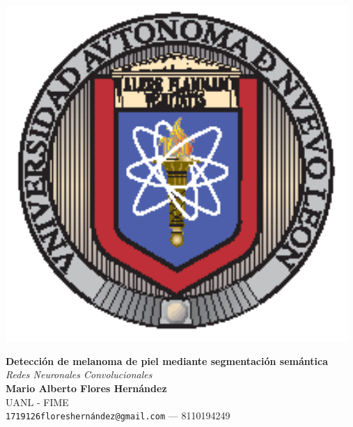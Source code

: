 \documentclass[a0,portrait]{a0poster}
\begin{document}
\begin{minipage}[b]{0.20\linewidth}
    \begin{center}
        \includegraphics[width=13cm]{uanl.eps}\\
        \vspace{5.5cm}
    \end{center}
\end{minipage}
%
\begin{minipage}[b]{0.60\linewidth}
    \begin{center}
        \veryHuge \color{Black} \textbf{Detección de melanoma de piel mediante segmentación semántica} \color{Black} \\[0.5cm]
        \Huge \textit{Redes Neuronales Convolucionales}\\[2cm]
        \LARGE \textbf{Mario Alberto Flores Hernández}\\[0.5cm]
        \huge UANL - FIME \\[0.4cm]
        \Large \texttt{1719126floreshernández@gmail.com} --- 8110194249
    \end{center}
\end{minipage}
%
\end{document}
